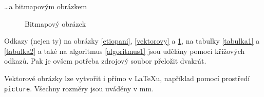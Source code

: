 \documentclass[a4paper, 11pt]{article}
\begin{document}
\ldots a bitmapovým obrázkem

\begin{figure}[ht]

	\begin{center}
		\caption{Bitmapový obrázek}
		\label{bitmapovy}
	\end{center}

\end{figure}

\par Odkazy (nejen ty) na obrázky \ref{etiopani}, \ref{vektorovy} a \ref{bitmapovy}, na tabulky \ref{tabulka1} a \ref{tabulka2} a také na algoritmus \ref{algoritmus1} jsou udělány pomocí křížových odkazů. Pak je ovšem potřeba zdrojový soubor přeložit dvakrát.
\par Vektorové obrázky lze vytvořit i přímo v \LaTeX u, například pomocí prostředí \texttt{picture}. Všechny rozměry jsou uváděny v mm.
\end{document}
